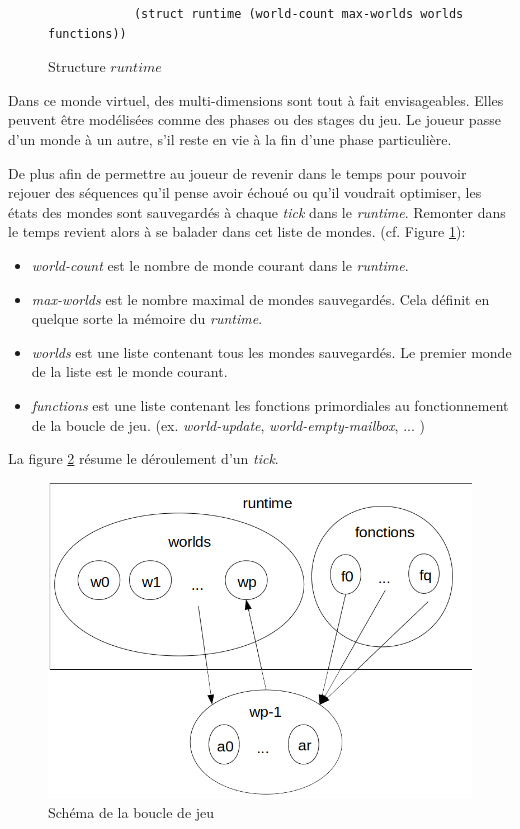 \documentclass{article}
\begin{document}
   \begin{figure}[h]
      \centering
        \begin{verbatim}
            (struct runtime (world-count max-worlds worlds functions))
        \end{verbatim}
      \caption{Structure $runtime$}
      \label{fig:runtime}
  \end{figure}
  
  Dans ce monde virtuel, des multi-dimensions sont tout à fait envisageables. Elles peuvent être modélisées comme des phases ou des stages du jeu. Le joueur passe d'un monde à un autre, s'il reste en vie à la fin d'une phase particulière. 
  
  De plus afin de permettre au joueur de revenir dans le temps pour pouvoir rejouer des séquences qu'il pense avoir échoué ou qu'il voudrait optimiser, les états des mondes sont sauvegardés à chaque \textit{tick} dans le \textit{runtime}. Remonter dans le temps revient alors à se balader dans cet liste de mondes. 
  (cf. Figure \ref{fig:runtime}):
  \begin{itemize}
    \item \textit{world-count} est le nombre de monde courant dans le \textit{runtime}.
    \item \textit{max-worlds} est le nombre maximal de mondes sauvegardés. Cela définit en quelque sorte la mémoire du \textit{runtime}.
    \item \textit{worlds} est une liste contenant tous les mondes sauvegardés. Le premier monde de la liste est le monde courant. 
    \item \textit{functions} est une liste contenant les fonctions primordiales au fonctionnement de la boucle de jeu. (ex. \textit{world-update}, \textit{world-empty-mailbox}, ... ) 
  \end{itemize}

La figure \ref{fig:boucle_jeu} résume le déroulement d'un \textit{tick}.

\begin{figure}
    \centering
    \includegraphics[scale=0.5]{img/boucle_jeu.png}
    \caption{Schéma de la boucle de jeu}
    \label{fig:boucle_jeu}
\end{figure}
\end{document}
